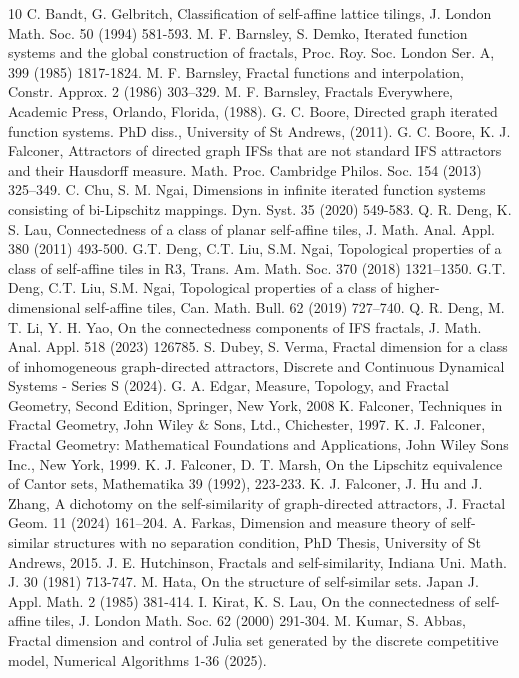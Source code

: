 \documentclass[a4paper,12pt,reqno]{amsart}
\numberwithin{equation}{section}
\theoremstyle{definition}
\theoremstyle{remark}
\numberwithin{equation}{section}
\begin{document}
	
	\begin{thebibliography}{10}
   C. Bandt, G. Gelbritch, Classification of self-affine lattice tilings, J. London Math. Soc. 50 (1994) 581-593.
   M. F. Barnsley, S. Demko, Iterated function systems and the global construction of fractals, Proc.
Roy. Soc. London Ser. A, 399 (1985) 1817-1824.
   M. F. Barnsley, Fractal functions and interpolation, Constr. Approx. 2 (1986) 303–329.
  M. F. Barnsley, Fractals Everywhere, Academic Press, Orlando, Florida, (1988).
  G. C. Boore, Directed graph iterated function systems. PhD diss., University of St Andrews, (2011).
  G. C. Boore, K. J. Falconer, Attractors of directed graph IFSs that are not standard IFS attractors and their Hausdorff measure. Math. Proc. Cambridge Philos. Soc. 154  (2013) 325–349.
   C. Chu, S. M. Ngai, Dimensions in infinite iterated function systems consisting of bi-Lipschitz mappings. Dyn. Syst. 35 (2020) 549-583.
   Q. R. Deng, K. S. Lau, Connectedness of a class of planar self-affine tiles, J. Math. Anal. Appl. 380 (2011) 493-500.
   G.T. Deng, C.T. Liu, S.M. Ngai, Topological properties of a class of self-affine tiles in R3, Trans. Am. Math. Soc. 370 (2018) 1321–1350.
   G.T. Deng, C.T. Liu, S.M. Ngai, Topological properties of a class of higher-dimensional self-affine tiles, Can. Math. Bull. 62 (2019) 727–740. 
   Q. R.  Deng, M. T. Li, Y. H. Yao,  On the connectedness components of IFS fractals, J. Math. Anal. Appl. 518  (2023) 126785.
   S. Dubey, S. Verma, Fractal dimension for a class of inhomogeneous graph-directed attractors, Discrete and Continuous Dynamical Systems - Series S (2024).
   G. A. Edgar, Measure, Topology, and Fractal Geometry, Second Edition, Springer, New York, 2008
    K. Falconer, Techniques in Fractal Geometry, John Wiley $\&$ Sons, Ltd., Chichester,
1997.
 K. J. Falconer, Fractal Geometry: Mathematical Foundations and Applications, John Wiley Sons Inc., New York, 1999.
 K. J. Falconer, D. T. Marsh, On the Lipschitz equivalence of Cantor sets, Mathematika 39 (1992), 223-233.
 K. J. Falconer, J. Hu and J. Zhang, A dichotomy on the self-similarity of graph-directed attractors, J. Fractal Geom. 11 (2024) 161–204.
 A. Farkas, Dimension and measure theory of self-similar structures with no separation condition, PhD
Thesis, University of St Andrews, 2015.
   J. E. Hutchinson, Fractals and self-similarity, Indiana Uni. Math. J. 30 (1981) 713-747.
   M. Hata, On the structure of self-similar sets. Japan J. Appl. Math. 2 (1985) 381-414.
    I. Kirat, K. S. Lau, On the connectedness of self-affine tiles, J. London Math. Soc. 62 (2000) 291-304.
   M. Kumar, S. Abbas, Fractal dimension and control of Julia set generated by the discrete competitive model, Numerical Algorithms 1-36 (2025).


\end{thebibliography}
\end{document}
